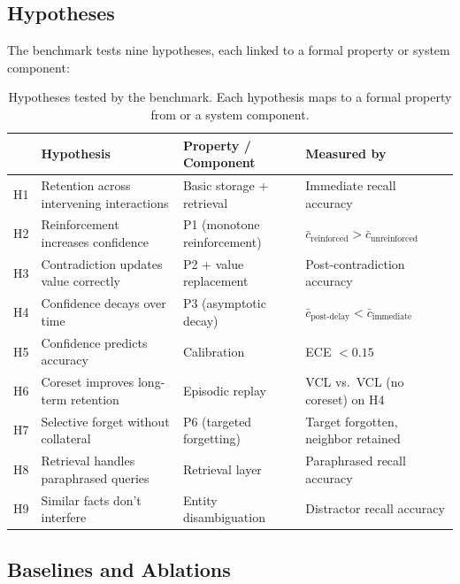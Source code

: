 \subsection{Hypotheses}
\label{sec:hypotheses}

The benchmark tests nine hypotheses, each linked to a formal property or system component:

\begin{table}[t]
  \centering
  \caption{Hypotheses tested by the benchmark. Each hypothesis maps to a formal property from  or a system component.}
  \label{tab:hypotheses}
  \small
  \begin{tabular}{@{}c l l l@{}}
    \toprule
    & \textbf{Hypothesis} & \textbf{Property / Component} & \textbf{Measured by} \\
    \midrule
    \rowcolor{nodeGray}
    H1 & Retention across intervening interactions & Basic storage + retrieval & Immediate recall accuracy \\
    H2 & Reinforcement increases confidence & P1 (monotone reinforcement) & $\bar{c}_{\text{reinforced}} > \bar{c}_{\text{unreinforced}}$ \\
    \rowcolor{nodeGray}
    H3 & Contradiction updates value correctly & P2 + value replacement & Post-contradiction accuracy \\
    H4 & Confidence decays over time & P3 (asymptotic decay) & $\bar{c}_{\text{post-delay}} < \bar{c}_{\text{immediate}}$ \\
    \rowcolor{nodeGray}
    H5 & Confidence predicts accuracy & Calibration & ECE $< 0.15$ \\
    H6 & Coreset improves long-term retention & Episodic replay & VCL vs.\ VCL (no coreset) on H4 \\
    \rowcolor{nodeGray}
    H7 & Selective forget without collateral & P6 (targeted forgetting) & Target forgotten, neighbor retained \\
    H8 & Retrieval handles paraphrased queries & Retrieval layer & Paraphrased recall accuracy \\
    \rowcolor{nodeGray}
    H9 & Similar facts don't interfere & Entity disambiguation & Distractor recall accuracy \\
    \bottomrule
  \end{tabular}
\end{table}


\subsection{Baselines and Ablations}
\label{sec:baselines}

